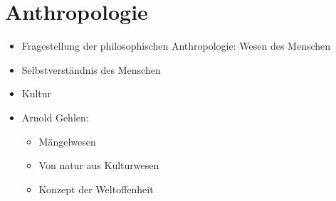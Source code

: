 
\section{Anthropologie}

\begin{itemize}
    \item Fragestellung der philosophischen Anthropologie: Wesen des Menschen
    \item Selbstverständnis des Menschen
    \item Kultur
    \item Arnold Gehlen:
    \begin{itemize}
        \item Mängelwesen
        \item Von natur aus Kulturwesen
        \item Konzept der Weltoffenheit
    \end{itemize}
\end{itemize}
